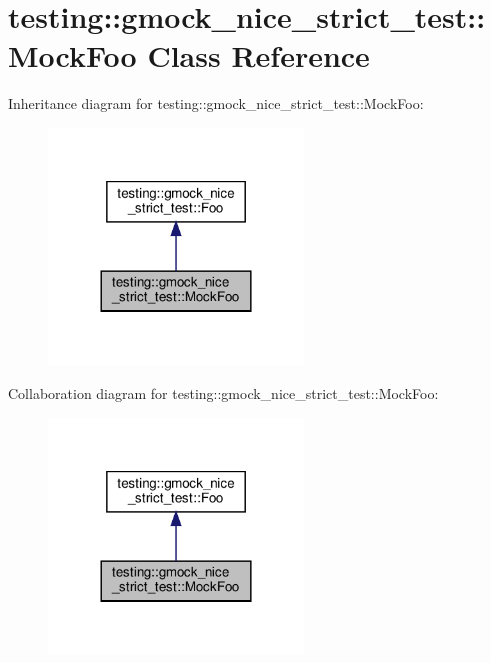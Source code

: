 \hypertarget{classtesting_1_1gmock__nice__strict__test_1_1_mock_foo}{}\section{testing\+:\+:gmock\+\_\+nice\+\_\+strict\+\_\+test\+:\+:Mock\+Foo Class Reference}
\label{classtesting_1_1gmock__nice__strict__test_1_1_mock_foo}


Inheritance diagram for testing\+:\+:gmock\+\_\+nice\+\_\+strict\+\_\+test\+:\+:Mock\+Foo\+:
\nopagebreak
\begin{figure}[H]
\begin{center}
\leavevmode
\includegraphics[width=192pt]{classtesting_1_1gmock__nice__strict__test_1_1_mock_foo__inherit__graph}
\end{center}
\end{figure}


Collaboration diagram for testing\+:\+:gmock\+\_\+nice\+\_\+strict\+\_\+test\+:\+:Mock\+Foo\+:
\nopagebreak
\begin{figure}[H]
\begin{center}
\leavevmode
\includegraphics[width=192pt]{classtesting_1_1gmock__nice__strict__test_1_1_mock_foo__coll__graph}
\end{center}
\end{figure}
